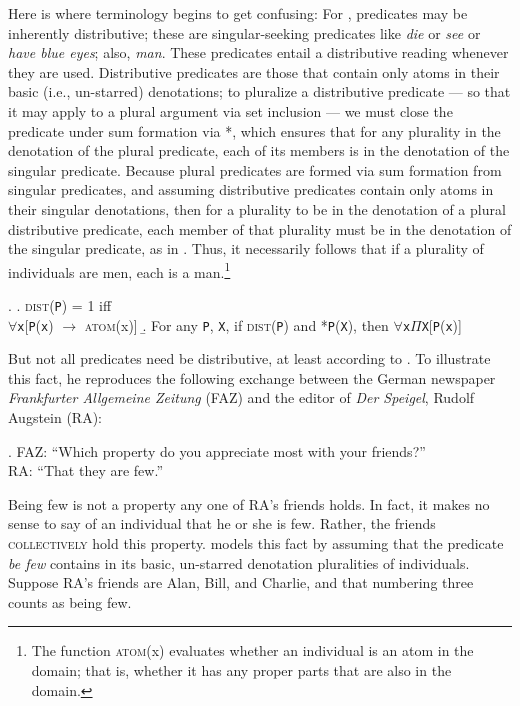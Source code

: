 \documentclass[linguex]{sp}
\begin{document}
Here is where terminology begins to get confusing: For \citeauthor{link1983}, predicates may be inherently distributive; these are singular-seeking predicates like \emph{die} or \emph{see} or \emph{have blue eyes}; also, \emph{man}. These predicates entail a distributive reading whenever they are used.
Distributive predicates are those that contain only atoms in their basic (i.e., un-starred) denotations; to pluralize a distributive predicate --- so that it may apply to a plural argument via set inclusion --- we must close the predicate under sum formation via *, which ensures that for any plurality in the denotation of the plural predicate, each of its members is in the denotation of the singular predicate. Because plural predicates are formed via sum formation from singular predicates, and assuming distributive predicates contain only atoms in their singular denotations, then for a plurality to be in the denotation of a plural distributive predicate, each member of that plurality must be in the denotation of the singular predicate, as in \Next. Thus, it necessarily follows that if a plurality of individuals are men, each is a man.\footnote{The function \textsc{atom}(x) evaluates whether an individual is an atom in the domain; that is, whether it has any proper parts that are also in the domain.}

\ex. \a. \textsc{dist}(\texttt{P}) = 1 iff\\
$\forall$\texttt{x}[\texttt{P}(\texttt{x}) $\rightarrow$ \textsc{atom}(x)]
\b. For any \texttt{P}, \texttt{X}, if \textsc{dist}(\texttt{P}) and *\texttt{P}(\texttt{X}), then
$\forall$\texttt{x}$\Pi$\texttt{X}[\texttt{P}(\texttt{x})]


But not all predicates need be distributive, at least according to \citeauthor{link1983}. To illustrate this fact, he reproduces the following exchange between the German newspaper \emph{Frankfurter Allgemeine Zeitung} (FAZ) and the editor of \emph{Der Speigel}, Rudolf Augstein (RA): 

\ex. FAZ: ``Which property do you appreciate most with your friends?''\\
RA: ``That they are few.''

Being few is not a property any one of RA's friends holds. In fact, it makes no sense to say of an individual that he or she is few. Rather, the friends \textsc{collectively} hold this property. \citeauthor{link1983} models this fact by assuming that the predicate \emph{be few} contains in its basic, un-starred denotation pluralities of individuals. Suppose RA's friends are Alan, Bill, and Charlie, and that numbering three counts as being few.
\end{document}
